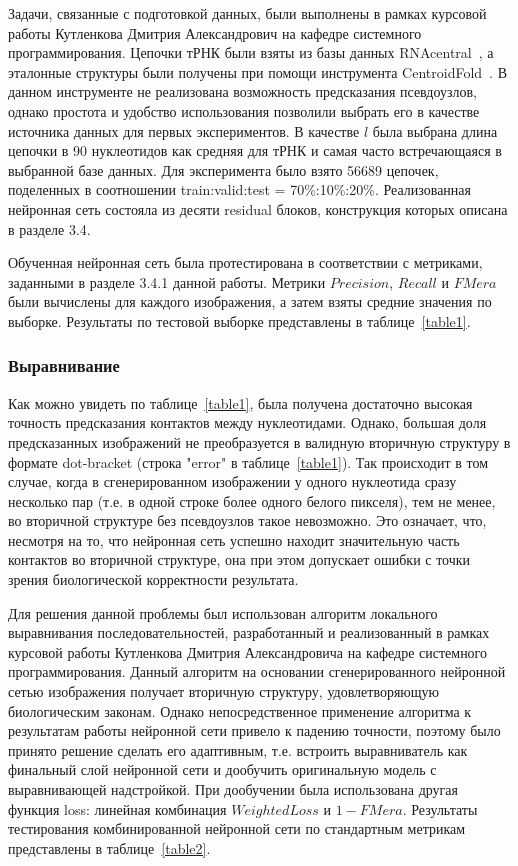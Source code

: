 \documentclass[14pt]{matmex-diploma-custom}
\begin{document}
Задачи, связанные с подготовкой данных, были выполнены в рамках курсовой работы Кутленкова Дмитрия Александрович на кафедре системного программирования. Цепочки тРНК были взяты из базы данных RNAcentral~\cite{rnacentral}, а эталонные структуры были получены при помощи инструмента CentroidFold~\cite{sato2009centroidfold}. В данном инструменте не реализована возможность предсказания псевдоузлов, однако простота и удобство использования позволили выбрать его в качестве источника данных для первых экспериментов. В качестве $l$ была выбрана длина цепочки в 90 нуклеотидов как средняя для тРНК и самая часто встречающаяся в выбранной базе данных. Для эксперимента было взято 56689 цепочек, поделенных в соотношении train:valid:test = 70\%:10\%:20\%. Реализованная нейронная сеть состояла из десяти residual блоков, конструкция которых описана в разделе 3.4.

Обученная нейронная сеть была протестирована в соответствии с метриками, заданными в разделе 3.4.1 данной работы. Метрики $Precision$, $Recall$ и $FMera$ были вычислены для каждого изображения, а затем взяты средние значения по выборке. Результаты по тестовой выборке представлены в таблице~\ref{table1}.



\subsubsection{Выравнивание}
Как можно увидеть по таблице~\ref{table1}, была получена достаточно высокая точность предсказания контактов между нуклеотидами. Однако, большая доля предсказанных изображений не преобразуется в валидную вторичную структуру в формате dot-bracket (строка "error" в таблице~\ref{table1}). Так происходит в том случае, когда в сгенерированном изображении у одного нуклеотида сразу несколько пар (т.е. в одной строке более одного белого пикселя), тем не менее, во вторичной структуре без псевдоузлов такое невозможно. Это означает, что, несмотря на то, что нейронная сеть успешно находит значительную часть контактов во вторичной структуре, она при этом допускает ошибки с точки зрения биологической корректности результата. 

Для решения данной проблемы был использован алгоритм локального выравнивания последовательностей, разработанный и реализованный в рамках курсовой работы Кутленкова Дмитрия Александровича на кафедре системного программирования. Данный алгоритм на основании сгенерированного нейронной сетью изображения получает вторичную структуру, удовлетворяющую биологическим законам. Однако непосредственное применение алгоритма к результатам работы нейронной сети привело к падению точности, поэтому было принято решение сделать его адаптивным, т.е. встроить выравниватель как финальный слой нейронной сети и дообучить оригинальную модель с выравнивающей надстройкой. При дообучении была использована другая функция loss: линейная комбинация $WeightedLoss$ и $1 - FMera$. Результаты тестирования комбинированной нейронной сети по стандартным метрикам представлены в таблице~\ref{table2}. 
\end{document}
